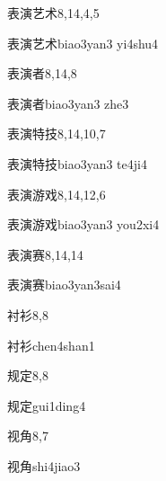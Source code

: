 \begin{entry}{表演艺术}{8,14,4,5}
  \begin{phonetics}{表演艺术}{biao3yan3 yi4shu4}
  \end{phonetics}
\end{entry}

\begin{entry}{表演者}{8,14,8}
  \begin{phonetics}{表演者}{biao3yan3 zhe3}
  \end{phonetics}
\end{entry}

\begin{entry}{表演特技}{8,14,10,7}
  \begin{phonetics}{表演特技}{biao3yan3 te4ji4}
  \end{phonetics}
\end{entry}

\begin{entry}{表演游戏}{8,14,12,6}
  \begin{phonetics}{表演游戏}{biao3yan3 you2xi4}
  \end{phonetics}
\end{entry}

\begin{entry}{表演赛}{8,14,14}
  \begin{phonetics}{表演赛}{biao3yan3sai4}
  \end{phonetics}
\end{entry}

\begin{entry}{衬衫}{8,8}
  \begin{phonetics}{衬衫}{chen4shan1}
  \end{phonetics}
\end{entry}

\begin{entry}{规定}{8,8}
  \begin{phonetics}{规定}{gui1ding4}
  \end{phonetics}
\end{entry}

\begin{entry}{视角}{8,7}
  \begin{phonetics}{视角}{shi4jiao3}
  \end{phonetics}
\end{entry}

